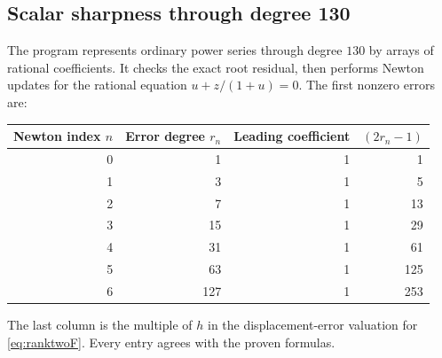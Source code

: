 \documentclass[11pt,a4paper]{article}
\theoremstyle{definition}
\theoremstyle{remark}
\begin{document}
\subsection{Scalar sharpness through degree 130}
The program represents ordinary power series through degree $130$ by
arrays of rational coefficients. It checks the exact root residual, then
performs Newton updates for the rational equation
$u+z/(1+u)=0$. The first nonzero errors are:
\begin{center}
\begin{tabular}{@{}rrrr@{}}
\toprule
Newton index $n$ & Error degree $r_n$ & Leading coefficient & $(2r_n-1)$\\
\midrule
0 & 1 & 1 & 1\\
1 & 3 & 1 & 5\\
2 & 7 & 1 & 13\\
3 & 15 & 1 & 29\\
4 & 31 & 1 & 61\\
5 & 63 & 1 & 125\\
6 & 127 & 1 & 253\\
\bottomrule
\end{tabular}
\end{center}
The last column is the multiple of $h$ in the displacement-error valuation
for \eqref{eq:ranktwoF}. Every entry agrees with the proven formulas.
\end{document}
